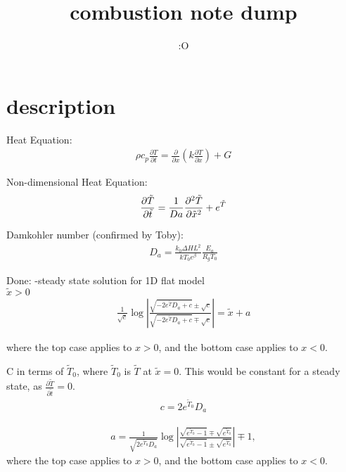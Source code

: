 \documentclass[12pt]{article}
\title{combustion note dump}
\author{:O}
\begin{document}
\maketitle
\section{description}

Heat Equation:
\begin{align} \label{Heat Equation}
    \rho c_p \frac{\partial T}{\partial t} = \frac{\partial}{\partial x} \left(k \frac{\partial T}{\partial x}\right) + G
\end{align}

Non-dimensional Heat Equation:
\begin{equation} \label{Non-dimensional heat equation}
    \frac{\partial \Tilde{T}}{\partial \Tilde{t}} = \frac{1}{Da}\frac{\partial^2 \Tilde{T}}{\partial \Tilde{x}^2} + e^{\Tilde{T}}
\end{equation}

Damkohler number (confirmed by Toby):
\begin{align} \label{Damkohler Number}
    D_a = \frac{k_0 \Delta H L^2}{kT_0 e^{\beta}} \frac{E_a}{R_gT_0} 
\end{align}


Done:
-steady state solution for 1D flat model \\

$\tilde{x} > 0$
\begin{align} \label{Steady State Solution}
    \frac{1}{\sqrt{c}} \log\left| \frac{\sqrt{-2e^{\tilde{T}}D_a +c}\pm\sqrt{c}}{\sqrt{-2e^{\tilde{T}}D_a +c}\mp\sqrt{c}} \right| = \tilde{x} + a
\end{align}

where the top case applies to $x>0$, and the bottom case applies to $x<0$.


C in terms of $\tilde{T}_0$, where $\tilde{T}_0$ is $\tilde{T}$ at $\tilde{x} = 0$. This would be constant for a steady state, as $\frac{\partial \tilde{T}}{\partial \tilde{t}} = 0$.
\begin{align}
    c = 2e^{\tilde{T}_0}D_a
\end{align}

\begin{align}
    a = \frac{1}{\sqrt{2e^{\tilde{T}_0}D_a}} \log\left| \frac{\sqrt{e^{\tilde{T}_0}-1} \mp \sqrt{e^{\tilde{T}_0}}}{\sqrt{e^{\tilde{T}_0}-1} \pm \sqrt{e^{\tilde{T}_0}}} \right| \mp 1,
\end{align}
where the top case applies to $x>0$, and the bottom case applies to $x<0$.
\end{document}

